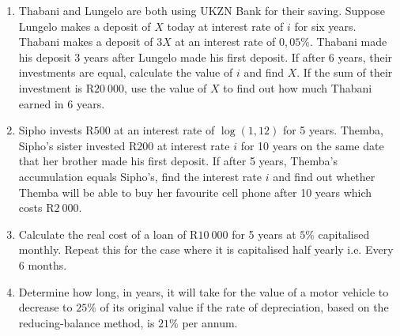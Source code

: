 \begin{eocexercises}{}
\begin{enumerate}
\item{Thabani and Lungelo are both using UKZN Bank for their saving. Suppose Lungelo makes a deposit of $X$ today at interest rate of $i$ for six years. Thabani makes a deposit of $3X$ at an interest rate of $0,05\%$. Thabani made his deposit 3 years after Lungelo made his first deposit. If after 6 years, their investments are equal, calculate the value of $i$ and find $X$. If the sum of their investment is R$20~000$, use the value of $X$ to find out how much Thabani earned in 6 years.}

\item{Sipho invests R$500$ at an interest rate of $\log(1,12)$ for 5 years. Themba, Sipho's sister invested R$200$ at interest rate $i$ for 10 years on the same date that her brother made his first deposit. If after 5 years, Themba's accumulation equals Sipho's, find the interest rate $i$ and find out whether Themba will be able to buy her favourite cell phone after 10 years which costs R$2~000$.}


\item{Calculate the real cost of a loan of R$10~000$ for 5 years at $5\%$ capitalised monthly. Repeat this for the case where it is capitalised half yearly i.e.\@{} Every 6 months.}
\item{Determine how long, in years, it will take for the value of a motor vehicle to decrease
to $25\%$ of its original value if the rate of depreciation, based on the reducing-balance
method, is $21\%$ per annum.}


\end{enumerate}
\end{eocexercises}
